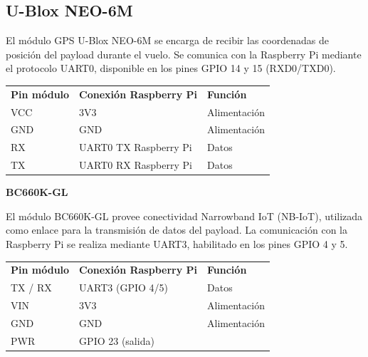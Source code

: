 \documentclass[12pt,a4paper]{article}
\newcounter{none} %
\begin{document}
\subsection{\texorpdfstring{U-Blox NEO-6M }{U-Blox NEO-6M }}\label{u-blox-neo-6m}

El módulo GPS U-Blox NEO-6M se encarga de recibir las coordenadas de posición del payload durante el vuelo. Se comunica con la Raspberry Pi mediante el protocolo UART0, disponible en los pines GPIO 14 y 15 (RXD0/TXD0).

{\def\LTcaptype{none} %
\begin{longtable}[]{@{}
  >{\centering\arraybackslash}p{}
  >{\centering\arraybackslash}p{}
  >{\centering\arraybackslash}p{}@{}}
\toprule\noalign{}
\endhead
\bottomrule\noalign{}
\endlastfoot
\textbf{Pin módulo} & \textbf{Conexión Raspberry Pi} & \textbf{Función} \\
VCC & 3V3 & Alimentación \\
GND & GND & Alimentación \\
RX & UART0 TX Raspberry Pi & Datos \\
TX & UART0 RX Raspberry Pi & Datos \\
\end{longtable}
}

\textbf{BC660K-GL}

El módulo BC660K-GL provee conectividad Narrowband IoT (NB-IoT), utilizada como enlace para la transmisión de datos del payload. La comunicación con la Raspberry Pi se realiza mediante UART3, habilitado en los pines GPIO 4 y 5.

{\def\LTcaptype{none} %
\begin{longtable}[]{@{}
  >{\centering\arraybackslash}p{}
  >{\centering\arraybackslash}p{}
  >{\centering\arraybackslash}p{}@{}}
\toprule\noalign{}
\endhead
\bottomrule\noalign{}
\endlastfoot
\textbf{Pin módulo} & \textbf{Conexión Raspberry Pi} & \textbf{Función} \\
TX / RX & UART3 (GPIO 4/5) & Datos \\
VIN & 3V3 & Alimentación \\
GND & GND & Alimentación \\
PWR & GPIO 23 (salida) & \\
\end{longtable}
}
\end{document}
